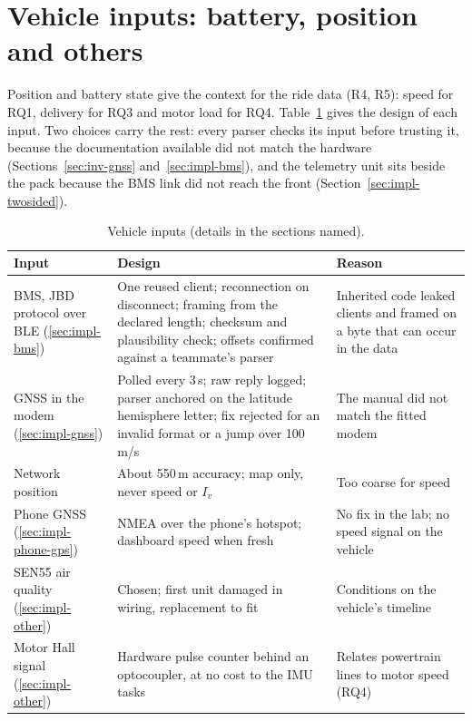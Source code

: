 \section{Vehicle inputs: battery, position and others}
\label{sec:bms-interface}
\label{sec:gnss-parsing-validation}
\label{sec:gnss-outdoor}
\label{sec:environmental-sensing}
\label{sec:hall-tap}

Position and battery state give the context for the ride data (R4, R5): speed for RQ1, delivery for RQ3 and motor load for RQ4. Table~\ref{tab:vehicle-inputs} gives the design of each input. Two choices carry the rest: every parser checks its input before trusting it, because the documentation available did not match the hardware (Sections~\ref{sec:inv-gnss} and~\ref{sec:impl-bms}), and the telemetry unit sits beside the pack because the BMS link did not reach the front (Section~\ref{sec:impl-twosided}).

\begin{table}[htbp]
\centering
\small
\caption[Vehicle inputs (details in the sections named)]{Vehicle inputs (details in the sections named).}
\label{tab:vehicle-inputs}
\begin{tabular}{|p{2.4cm}|p{8.0cm}|p{3.8cm}|}
\hline
\textbf{Input} & \textbf{Design} & \textbf{Reason} \\ \hline
BMS, JBD protocol over BLE (\ref{sec:impl-bms}) & One reused client; reconnection on disconnect; framing from the declared length; checksum and plausibility check; offsets confirmed against a teammate's parser & Inherited code leaked clients and framed on a byte that can occur in the data \\ \hline
GNSS in the modem (\ref{sec:impl-gnss}) & Polled every 3\,s; raw reply logged; parser anchored on the latitude hemisphere letter; fix rejected for an invalid format or a jump over 100\,m/s & The manual \cite{simcoma76xx} did not match the fitted modem \\ \hline
Network position & About 550\,m accuracy; map only, never speed or $I_v$ & Too coarse for speed \\ \hline
Phone GNSS (\ref{sec:impl-phone-gps}) & NMEA over the phone's hotspot; dashboard speed when fresh & No fix in the lab; no speed signal on the vehicle \\ \hline
SEN55 air quality \cite{sensirionsen5x} (\ref{sec:impl-other}) & Chosen; first unit damaged in wiring, replacement to fit & Conditions on the vehicle's timeline \\ \hline
Motor Hall signal (\ref{sec:impl-other}) & Hardware pulse counter behind an optocoupler, at no cost to the IMU tasks & Relates powertrain lines to motor speed (RQ4) \\ \hline
\end{tabular}
\end{table}

